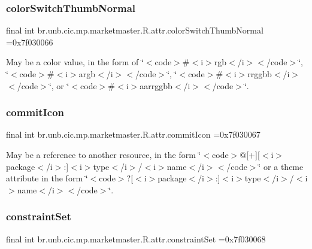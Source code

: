 \subsubsection{\texorpdfstring{color\+Switch\+Thumb\+Normal}{colorSwitchThumbNormal}}
{\footnotesize\ttfamily final int br.\+unb.\+cic.\+mp.\+marketmaster.\+R.\+attr.\+color\+Switch\+Thumb\+Normal =0x7f030066\hspace{0.3cm}{\ttfamily [static]}}

May be a color value, in the form of \char`\"{}$<$code$>$\#$<$i$>$rgb$<$/i$>$$<$/code$>$\char`\"{}, \char`\"{}$<$code$>$\#$<$i$>$argb$<$/i$>$$<$/code$>$\char`\"{}, \char`\"{}$<$code$>$\#$<$i$>$rrggbb$<$/i$>$$<$/code$>$\char`\"{}, or \char`\"{}$<$code$>$\#$<$i$>$aarrggbb$<$/i$>$$<$/code$>$\char`\"{}. \mbox{\label{classbr_1_1unb_1_1cic_1_1mp_1_1marketmaster_1_1R_1_1attr_a5358b76c39e8c3942d4cc113ba4cba72}} 
\subsubsection{\texorpdfstring{commit\+Icon}{commitIcon}}
{\footnotesize\ttfamily final int br.\+unb.\+cic.\+mp.\+marketmaster.\+R.\+attr.\+commit\+Icon =0x7f030067\hspace{0.3cm}{\ttfamily [static]}}

May be a reference to another resource, in the form \char`\"{}$<$code$>$@\mbox{[}+\mbox{]}\mbox{[}$<$i$>$package$<$/i$>$\+:\mbox{]}$<$i$>$type$<$/i$>$/$<$i$>$name$<$/i$>$$<$/code$>$\char`\"{} or a theme attribute in the form \char`\"{}$<$code$>$?\mbox{[}$<$i$>$package$<$/i$>$\+:\mbox{]}$<$i$>$type$<$/i$>$/$<$i$>$name$<$/i$>$$<$/code$>$\char`\"{}. \mbox{\label{classbr_1_1unb_1_1cic_1_1mp_1_1marketmaster_1_1R_1_1attr_a4a9a67464dd0ba2afb06e6c30612a41e}} 
\subsubsection{\texorpdfstring{constraint\+Set}{constraintSet}}
{\footnotesize\ttfamily final int br.\+unb.\+cic.\+mp.\+marketmaster.\+R.\+attr.\+constraint\+Set =0x7f030068\hspace{0.3cm}{\ttfamily [static]}}

